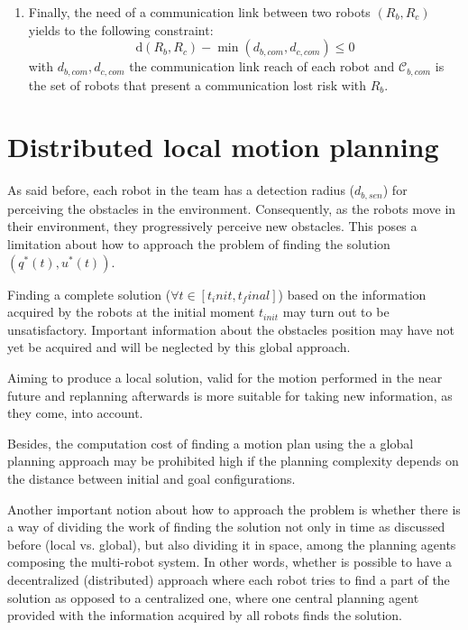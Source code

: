 \begin{enumerate}
    \item Finally, the need of a communication link between two robots $(R_b, R_c)$ yields to
    the following constraint:
    \begin{equation}\label{eq:com}
    	\mathrm{d}(R_b,R_c)  - \min(d_{b,com}, d_{c,com}) \leq 0
    \end{equation}
    with $d_{b,com}, d_{c,com}$ the communication link reach of each robot and
    $\mathcal{C}_{b,com}$ is the set of robots that present a communication lost risk with
    $R_b$.
\end{enumerate}



\chapter{Distributed local motion planning}

As said before, each robot in the team has a detection radius ($d_{b,sen}$) for perceiving the obstacles in the environment. Consequently, as the robots move in their environment, they progressively perceive new obstacles. This poses a limitation about how to approach the problem of finding the solution $(q^{*}(t), u^{*}(t))$.

Finding a complete solution ($\forall t \in [t_init, t_final]$) based on the information acquired by the robots at the initial moment $t_{init}$ may turn out to be unsatisfactory. Important information about the obstacles position may have not yet be acquired and will be neglected by this global approach.

Aiming to produce a local solution, valid for the motion performed in the near future and replanning afterwards is
more suitable for taking new information, as they come, into account.

Besides, the computation cost of finding a motion plan using
the a global planning approach may be prohibited high if the planning complexity depends
on the distance between initial and goal configurations.

Another important notion about how to approach the problem is whether there is a way of dividing the work of finding the solution not only in time as discussed before (local vs. global), but also dividing it in space, among the planning agents composing the multi-robot system. In other words, whether is possible to have a decentralized (distributed) approach where each robot tries to find a part of the solution as opposed to a centralized one, where one central planning agent provided with the information acquired by all robots finds the solution.

